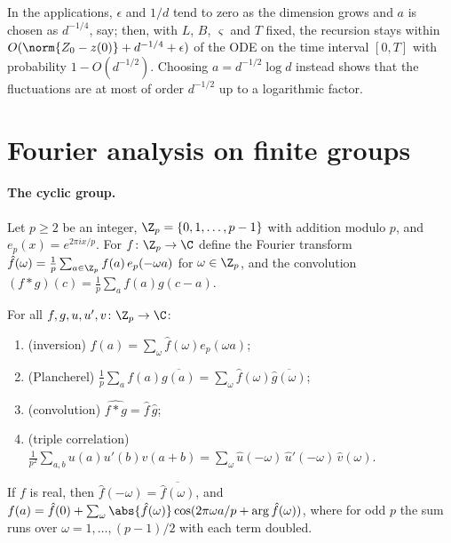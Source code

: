 \begin{refsection}
In the applications, $\epsilon$ and $1/d$ tend to zero as the dimension grows and $a$ is chosen as $d^{-1/4}$, say; then, with $L$, $B$, $\varsigma$ and $T$ fixed, the recursion stays within $O(\norm{Z_0-z(0)}+d^{-1/4}+\epsilon)$ of the ODE on the time interval $[0,T]$ with probability $1-O(d^{-1/2})$. Choosing $a=d^{-1/2}\log d$ instead shows that the fluctuations are at most of order $d^{-1/2}$ up to a logarithmic factor.

\section{Fourier analysis on finite groups}\label{sec:toolkit:fourier}

\paragraph{The cyclic group.} Let $p\ge2$ be an integer, $\Z_p=\{0,1,\dots,p-1\}$ with addition modulo $p$, and $e_p(x)=e^{2\pi ix/p}$. For $f\colon\Z_p\to\C$ define the Fourier transform $\hat f(\omega)=\frac1p\sum_{a\in\Z_p}f(a)\,e_p(-\omega a)$ for $\omega\in\Z_p$, and the convolution $(f*g)(c)=\frac1p\sum_af(a)g(c-a)$.

\begin{theorem}\label{thm:toolkit:fourier-zp}
For all $f,g,u,u',v\colon\Z_p\to\C$:
\begin{enumerate}
\item (inversion) $f(a)=\sum_\omega\hat f(\omega)e_p(\omega a)$;
\item (Plancherel) $\frac1p\sum_af(a)\overline{g(a)}=\sum_\omega\hat f(\omega)\overline{\hat g(\omega)}$;
\item (convolution) $\widehat{f*g}=\hat f\,\hat g$;
\item (triple correlation) $\frac1{p^2}\sum_{a,b}u(a)u'(b)v(a+b)=\sum_\omega\hat u(-\omega)\,\hat u'(-\omega)\,\hat v(\omega)$.
\end{enumerate}
If $f$ is real, then $\hat f(-\omega)=\overline{\hat f(\omega)}$, and $f(a)=\hat f(0)+\sum_{\omega}\abs{\hat f(\omega)}\cos(2\pi\omega a/p+\arg\hat f(\omega))$, where for odd $p$ the sum runs over $\omega=1,\dots,(p-1)/2$ with each term doubled.
\end{theorem}


\end{refsection}
